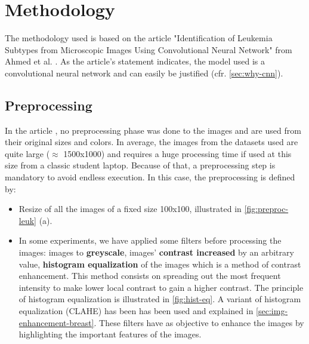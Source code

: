 \documentclass[11pt, openany]{report}
\theoremstyle{plain}
\theoremstyle{definition}
\theoremstyle{remark}
\begin{document}
\section{Methodology}

The methodology used is based on the article "Identification of Leukemia Subtypes from
Microscopic Images Using Convolutional Neural Network" from Ahmed et al. \citep{leukemia}. As the article's statement indicates, the model used is a convolutional neural network and can easily be justified (cfr. \autoref{sec:why-cnn}). 


\subsection{Preprocessing}
In the article \cite{leukemia}, no preprocessing phase was done to the images and are used from their original sizes and colors. In average, the images from the datasets used are quite large ($\approx$ 1500x1000) and requires a huge processing time if used at this size from a classic student laptop. Because of that, a preprocessing step is mandatory to avoid endless execution. In this case, the preprocessing is defined by: 
\begin{itemize}
\item Resize of all the images of a fixed size 100x100, illustrated in \autoref{fig:preproc-leuk} (a). 
\item In some experiments, we have applied some filters before processing the images: images to \textbf{greyscale}, images' \textbf{contrast increased} by an arbitrary value, \textbf{histogram equalization} of the images which is a method of contrast enhancement. This method consists on spreading out the most frequent intensity to make lower local contrast to gain a higher contrast. The principle of histogram equalization is illustrated in \autoref{fig:hist-eq}. A variant of histogram equalization (CLAHE) has been has been used and explained in \autoref{sec:img-enhancement-breast}. These filters have as objective to enhance the images by highlighting the important features of the images.  
\end{itemize}
\end{document}
